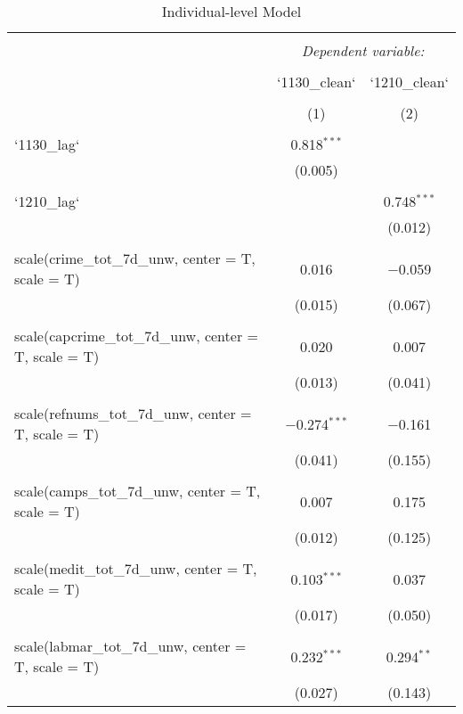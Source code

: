 
\begin{table}[!htbp] \centering 
  \caption{Individual-level Model} 
  \label{} 
\begin{tabular}{@{\extracolsep{5pt}}lcc} 
\\[-1.8ex]\hline 
\hline \\[-1.8ex] 
 & \multicolumn{2}{c}{\textit{Dependent variable:}} \\ 
\cline{2-3} 
\\[-1.8ex] & `1130\_clean` & `1210\_clean` \\ 
\\[-1.8ex] & (1) & (2)\\ 
\hline \\[-1.8ex] 
 `1130\_lag` & 0.818$^{***}$ &  \\ 
  & (0.005) &  \\ 
  & & \\ 
 `1210\_lag` &  & 0.748$^{***}$ \\ 
  &  & (0.012) \\ 
  & & \\ 
 scale(crime\_tot\_7d\_unw, center = T, scale = T) & 0.016 & $-$0.059 \\ 
  & (0.015) & (0.067) \\ 
  & & \\ 
 scale(capcrime\_tot\_7d\_unw, center = T, scale = T) & 0.020 & 0.007 \\ 
  & (0.013) & (0.041) \\ 
  & & \\ 
 scale(refnums\_tot\_7d\_unw, center = T, scale = T) & $-$0.274$^{***}$ & $-$0.161 \\ 
  & (0.041) & (0.155) \\ 
  & & \\ 
 scale(camps\_tot\_7d\_unw, center = T, scale = T) & 0.007 & 0.175 \\ 
  & (0.012) & (0.125) \\ 
  & & \\ 
 scale(medit\_tot\_7d\_unw, center = T, scale = T) & 0.103$^{***}$ & 0.037 \\ 
  & (0.017) & (0.050) \\ 
  & & \\ 
 scale(labmar\_tot\_7d\_unw, center = T, scale = T) & 0.232$^{***}$ & 0.294$^{**}$ \\ 
  & (0.027) & (0.143) \\ 

\end{tabular}
\end{table}
